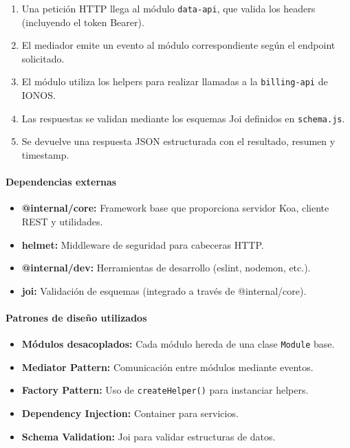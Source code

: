 \begin{enumerate}
    \item Una petición HTTP llega al módulo \texttt{data-api}, que valida los headers (incluyendo
          el token Bearer).
    \item El mediador emite un evento al módulo correspondiente según el endpoint solicitado.
    \item El módulo utiliza los helpers para realizar llamadas a la \texttt{billing-api} de IONOS.
    \item Las respuestas se validan mediante los esquemas Joi definidos en \texttt{schema.js}.
    \item Se devuelve una respuesta JSON estructurada con el resultado, resumen y timestamp.
\end{enumerate}

\paragraph{Dependencias externas}
\begin{itemize}
    \item \textbf{@internal/core:} Framework base que proporciona servidor Koa, cliente REST y utilidades.
    \item \textbf{helmet:} Middleware de seguridad para cabeceras HTTP.
    \item \textbf{@internal/dev:} Herramientas de desarrollo (eslint, nodemon, etc.).
    \item \textbf{joi:} Validación de esquemas (integrado a través de @internal/core).
\end{itemize}

\paragraph{Patrones de diseño utilizados}
\begin{itemize}
    \item \textbf{Módulos desacoplados:} Cada módulo hereda de una clase \texttt{Module} base.
    \item \textbf{Mediator Pattern:} Comunicación entre módulos mediante eventos.
    \item \textbf{Factory Pattern:} Uso de \texttt{createHelper()} para instanciar helpers.
    \item \textbf{Dependency Injection:} Container para servicios.
    \item \textbf{Schema Validation:} Joi para validar estructuras de datos.
\end{itemize}

